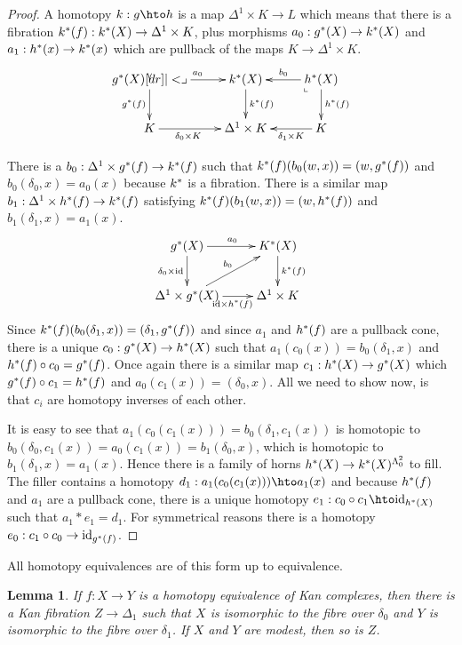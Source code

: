 \documentclass{amsart}
\theoremstyle{plain}
\newtheorem{lemma}[theorem]{Lemma}
\theoremstyle{definition}
\newcommand\id{\mathrm{id}}
\begin{document}
\begin{proof} A homotopy $k:g\hto h$ is a map $\Delta^1\times K \to L$ which means that there is a fibration $k^*(f):k^*(X) \to \Delta^1\times K$, plus morphisms $a_0:g^*(X) \to k^*(X)$ and $a_1:h^*(x) \to k^*(x)$ which are pullback of the maps $K \to \Delta^1\times K$.
\[\xymatrix{
g\ri(X) \ar[r]^{a_0}\ar[d]_{g\ri(f)} \pb & k\ri(X) \ar[d]^{k\ri(f)} & h\ri(X) \ar[l]_{b_0} \ar[d]^{h\ri(f)} \ar@{}[dl]|<\llcorner \\
K \ar[r]_(.4){\delta_0\times K} & \Delta^1\times K & K \ar[l]^(.4){\delta_1\times K}
}\]

There is a $b_0:\Delta^1\times g^*(f) \to k^*(f)$ such that $k^*(f)(b_0(w,x)) = (w,g^*(f))$ and $b_0(\delta_0,x) = a_0(x)$ because $k^*$ is a fibration. There is a similar map $b_1:\Delta^1\times h^*(f) \to k^*(f)$ satisfying  $k^*(f)(b_1(w,x)) = (w,h^*(f))$ and $b_1(\delta_1,x) = a_1(x)$.
\[\xymatrix{
g\ri(X) \ar[d]_{\delta_0\times \id} \ar[r]^{a_0} & K\ri(X)\ar[d]^{k\ri(f)}\\
\Delta^1\times g\ri(X) \ar[r]_{\id\times h\ri(f)} \ar[ur]^{b_0} & \Delta^1\times K
}\]
Since $k^*(f)( b_0(\delta_1, x) ) = (\delta_1,g^*(f))$ and since $a_1$ and $h^*(f)$ are a pullback cone, there is a unique $c_0:g^*(X)\to h^*(X)$ such that $a_1(c_0(x)) = b_0(\delta_1, x)$ and $h^*(f)\circ c_0 = g^*(f)$. Once again there is a similar map $c_1:h^*(X)\to g^*(X)$ which $g^*(f)\circ c_1 = h^*(f)$ and $a_0(c_1(x)) = (\delta_0,x)$. All we need to show now, is that $c_i$ are homotopy inverses of each other.

It is easy to see that $a_1(c_0(c_1(x))) = b_0(\delta_1,c_1(x))$ is homotopic to $b_0(\delta_0,c_1(x)) = a_0(c_1(x)) = b_1(\delta_0,x)$, which is homotopic to $b_1(\delta_1,x) = a_1(x)$. Hence there is a family of horns $h^*(X) \to k^*(X)^{\Lambda^2_0}$ to fill. The filler contains a homotopy $d_1:a_1(c_0(c_1(x))) \hto a_1(x)$ and because $h^*(f)$ and $a_1$ are a pullback cone, there is a unique homotopy $e_1:c_0\circ c_1\hto \id_{h\ri(X)}$ such that $a_1*e_1 = d_1$. For symmetrical reasons there is a homotopy $e_0:c_1\circ c_0 \to \id_{g\ri(f)}$.
\end{proof}

All homotopy equivalences are of this form up to equivalence.

\begin{lemma} If $f:X\to Y$ is a homotopy equivalence of Kan complexes, then there is a Kan fibration $Z\to\Delta_1$ such that $X$ is isomorphic to the fibre over $\delta_0$ and $Y$ is isomorphic to the fibre over $\delta_1$. If $X$ and $Y$ are modest, then so is $Z$. \label{hetoh} \end{lemma}
\end{document}

